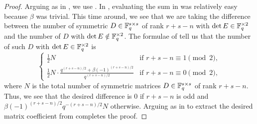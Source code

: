 \begin{proof}
	Arguing as in , we use . In , evaluating the sum in  was relatively easy because $\beta$ was trivial. This time around, we see that we are taking the difference between the number of symmetric $D\in\mathbb F_q^{s\times s}$ of rank $r+s-n$ with $\det E\in\mathbb F_q^{\times2}$ and the number of $D$ with $\det E\notin\mathbb F_q^{\times2}$. The formulae of \cite{macwilliams-ortho-matrices} tell us that the number of such $D$ with $\det E\in\mathbb F_q^{\times2}$ is
	\[\begin{cases}
		\frac12N & \text{if }r+s-n\equiv1\pmod2, \\
		\frac12N\cdot\frac{q^{(r+s-n)/2}+\beta(-1)^{(r+s-n)/2}}{q^{(r+s-n)/2}} & \text{if }r+s-n\equiv0\pmod2,
	\end{cases}\]
	where $N$ is the total number of symmetric matrices $D\in\mathbb F_q^{s\times s}$ of rank $r+s-n$. Thus, we see that the desired difference is $0$ if $r+s-n$ is odd and $\beta(-1)^{(r+s-n)/2}q^{-(r+s-n)/2}N$ otherwise. Arguing as in  to extract the desired matrix coefficient from  completes the proof.
\end{proof}



